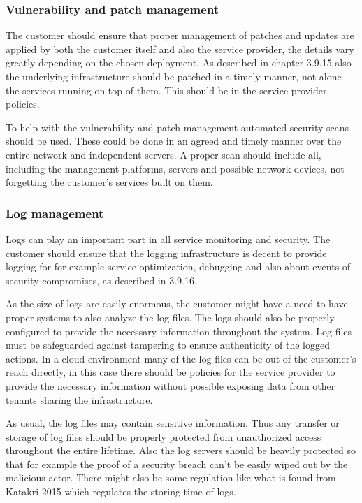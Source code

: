 \documentclass{article}
\begin{document}
\subsubsection{Vulnerability and patch management}
The customer should ensure that proper management of patches and updates are applied by both the customer itself and also the service provider, the details vary greatly depending on the chosen deployment. As described in chapter 3.9.15 also the underlying infrastructure should be patched in a timely manner, not alone the services running on top of them. This should be in the service provider policies.
\par
To help with the vulnerability and patch management automated security scans should be used. These could be done in an agreed and timely manner over the entire network and independent servers. A proper scan should include all, including the management platforms, servers and possible network devices, not forgetting the customer's services built on them.

\subsubsection{Log management}
Logs can play an important part in all service monitoring and security. The customer should ensure that the logging infrastructure is decent to provide logging for for example service optimization, debugging and also about events of security compromises, as described in 3.9.16.
\par
As the size of logs are easily enormous, the customer might have a need to have proper systems to also analyze the log files. The logs should also be properly configured to provide the necessary information throughout the system. Log files must be safeguarded against tampering to ensure authenticity of the logged actions. In a cloud environment many of the log files can be out of the customer's reach directly, in this case there should be policies for the service provider to provide the necessary information without possible exposing data from other tenants sharing the infrastructure.
\par
As usual, the log files may contain sensitive information. Thus any transfer or storage of log files should be properly protected from unauthorized access throughout the entire lifetime. Also the log servers should be heavily protected so that for example the proof of a security breach can't be easily wiped out by the malicious actor. There might also be some regulation like what is found from Katakri 2015 which regulates the storing time of logs.
\end{document}
